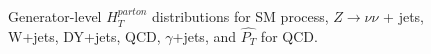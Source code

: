 \begin{figure}[!h]
\begin{center}
     \\
     ~~
    \\
    \caption{Generator-level $H_{T}^{parton}$ distributions for SM process, $Z\rightarrow \nu\nu$ + jets, W+jets, DY+jets, QCD, $\gamma$+jets, and $\hat{P_{T}}$ for QCD.}
    \label{fig:Lhe_Ht}
  \end{center}
\end{figure}

